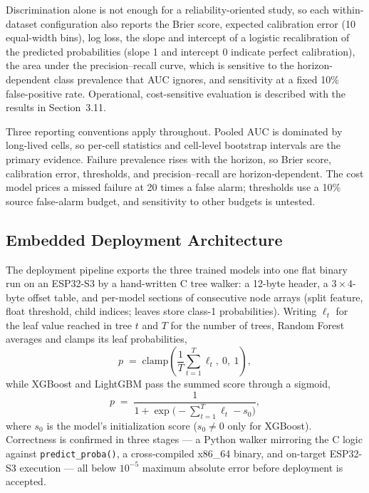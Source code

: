 \documentclass[preprint,12pt]{elsarticle}
\begin{document}
Discrimination alone is not enough for a reliability-oriented study, so each within-dataset configuration also reports the Brier score, expected calibration error (10 equal-width bins), log loss, the slope and intercept of a logistic recalibration of the predicted probabilities (slope 1 and intercept 0 indicate perfect calibration), the area under the precision--recall curve, which is sensitive to the horizon-dependent class prevalence that AUC ignores, and sensitivity at a fixed 10\% false-positive rate. Operational, cost-sensitive evaluation is described with the results in Section~3.11.

Three reporting conventions apply throughout. Pooled AUC is dominated by long-lived cells, so per-cell statistics and cell-level bootstrap intervals are the primary evidence. Failure prevalence rises with the horizon, so Brier score, calibration error, thresholds, and precision--recall are horizon-dependent. The cost model prices a missed failure at 20 times a false alarm; thresholds use a 10\% source false-alarm budget, and sensitivity to other budgets is untested.

\subsection{Embedded Deployment Architecture}
The deployment pipeline exports the three trained models into one flat binary run on an ESP32-S3 by a hand-written C tree walker: a 12-byte header, a $3{\times}4$-byte offset table, and per-model sections of consecutive node arrays (split feature, float threshold, child indices; leaves store class-1 probabilities). Writing $\ell_t$ for the leaf value reached in tree $t$ and $T$ for the number of trees, Random Forest averages and clamps its leaf probabilities,
\begin{equation}\label{eq:rf}
p \;=\; \mathrm{clamp}\!\left(\frac{1}{T}\sum_{t=1}^{T}\ell_t,\ 0,\ 1\right),
\end{equation}
while XGBoost and LightGBM pass the summed score through a sigmoid,
\begin{equation}\label{eq:sigmoid}
p \;=\; \frac{1}{1+\exp\!\bigl(-\textstyle\sum_{t=1}^{T}\ell_t - s_0\bigr)},
\end{equation}
where $s_0$ is the model's initialization score ($s_0\neq 0$ only for XGBoost). Correctness is confirmed in three stages --- a Python walker mirroring the C logic against \texttt{predict\_proba()}, a cross-compiled x86\_64 binary, and on-target ESP32-S3 execution --- all below $10^{-5}$ maximum absolute error before deployment is accepted.
\end{document}
